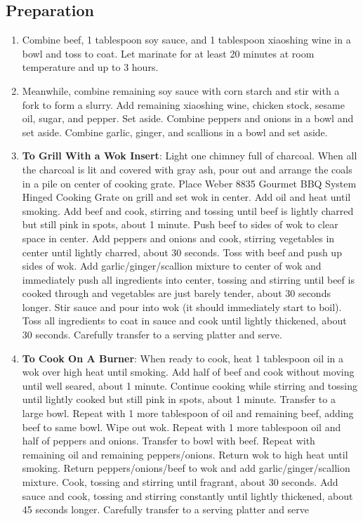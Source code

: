 \subsection{Preparation}
\begin{enumerate}
    \item Combine beef, 1 tablespoon soy sauce, and 1 tablespoon xiaoshing wine in a bowl and toss to coat. Let marinate for at least 20 minutes at room temperature and up to 3 hours.
    \item Meanwhile, combine remaining soy sauce with corn starch and stir with a fork to form a slurry. Add remaining xiaoshing wine, chicken stock, sesame oil, sugar, and pepper. Set aside. Combine peppers and onions in a bowl and set aside. Combine garlic, ginger, and scallions in a bowl and set aside.
    \item \textbf{To Grill With a Wok Insert}: Light one chimney full of charcoal. When all the charcoal is lit and covered with gray ash, pour out and arrange the coals in a pile on center of cooking grate. Place Weber 8835 Gourmet BBQ System Hinged Cooking Grate on grill and set wok in center. Add oil and heat until smoking. Add beef and cook, stirring and tossing until beef is lightly charred but still pink in spots, about 1 minute. Push beef to sides of wok to clear space in center. Add peppers and onions and cook, stirring vegetables in center until lightly charred, about 30 seconds. Toss with beef and push up sides of wok. Add garlic/ginger/scallion mixture to center of wok and immediately push all ingredients into center, tossing and stirring until beef is cooked through and vegetables are just barely tender, about 30 seconds longer. Stir sauce and pour into wok (it should immediately start to boil). Toss all ingredients to coat in sauce and cook until lightly thickened, about 30 seconds. Carefully transfer to a serving platter and serve.
    \item \textbf{To Cook On A Burner}: When ready to cook, heat 1 tablespoon oil in a wok over high heat until smoking. Add half of beef and cook without moving until well seared, about 1 minute. Continue cooking while stirring and tossing until lightly cooked but still pink in spots, about 1 minute. Transfer to a large bowl. Repeat with 1 more tablespoon of oil and remaining beef, adding beef to same bowl. Wipe out wok. Repeat with 1 more tablespoon oil and half of peppers and onions. Transfer to bowl with beef. Repeat with remaining oil and remaining peppers/onions. Return wok to high heat until smoking. Return peppers/onions/beef to wok and add garlic/ginger/scallion mixture. Cook, tossing and stirring until fragrant, about 30 seconds. Add sauce and cook, tossing and stirring constantly until lightly thickened, about 45 seconds longer. Carefully transfer to a serving platter and serve
\end{enumerate}


